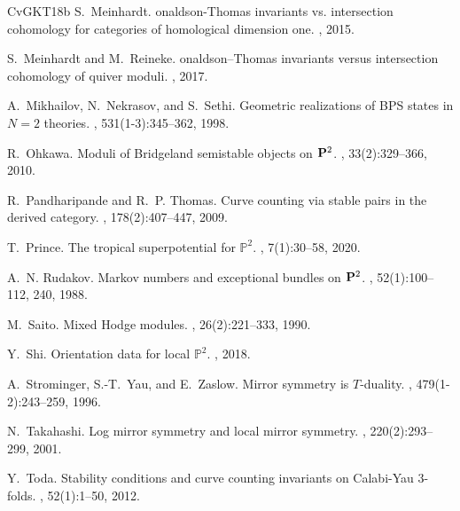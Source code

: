 \documentclass[12pt, a4paper]{amsart}
\begin{document}
\begin{thebibliography}{CvGKT18b}
S.~Meinhardt.
onaldson-{T}homas invariants vs. intersection cohomology for
  categories of homological dimension one.
, 2015.


S.~Meinhardt and M.~Reineke.
onaldson--{T}homas invariants versus intersection cohomology of
  quiver moduli.
, 2017.
 
A.~Mikhailov, N.~Nekrasov, and S.~Sethi.
\newblock Geometric realizations of {BPS} states in {$N=2$} theories.
, 531(1-3):345--362, 1998.



R.~Ohkawa.
\newblock Moduli of {B}ridgeland semistable objects on {${\bf P}^2$}.
, 33(2):329--366, 2010.


R.~Pandharipande and R.~P. Thomas.
\newblock Curve counting via stable pairs in the derived category.
, 178(2):407--447, 2009.

T.~Prince.
\newblock The tropical superpotential for $\mathbb{P}^2$.
, 7(1):30--58, 2020.







A.~N. Rudakov.
\newblock Markov numbers and exceptional bundles on {${\bf P}^2$}.
, 52(1):100--112, 240, 1988.

M.~Saito.
\newblock Mixed {H}odge modules.
, 26(2):221--333, 1990.


Y.~Shi.
\newblock Orientation data for local $\mathbb{P}^2$.
, 2018.

A.~Strominger, S.-T.~Yau, and E.~Zaslow.
\newblock Mirror symmetry is {$T$}-duality.
, 479(1-2):243--259, 1996.


N.~Takahashi.
\newblock Log mirror symmetry and local mirror symmetry.
, 220(2):293--299, 2001.

Y.~Toda.
\newblock Stability conditions and curve counting invariants on {C}alabi-{Y}au
  3-folds.
, 52(1):1--50, 2012.


\end{thebibliography}
\end{document}
